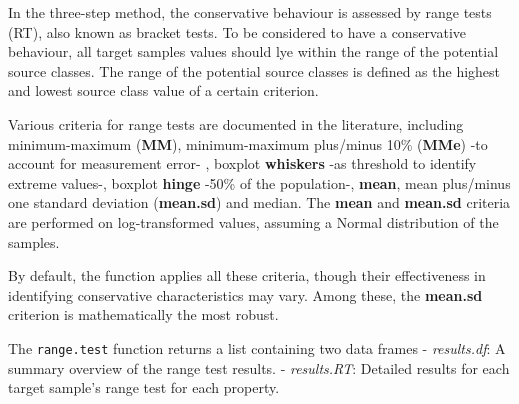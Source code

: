 \documentclass[
]{article}
\begin{document}
In the three-step method, the conservative behaviour is assessed by
range tests (RT), also known as bracket tests. To be considered to have
a conservative behaviour, all target samples values should lye within
the range of the potential source classes. The range of the potential
source classes is defined as the highest and lowest source class value
of a certain criterion.

Various criteria for range tests are documented in the literature,
including minimum-maximum (\textbf{MM}), minimum-maximum plus/minus 10\%
(\textbf{MMe}) -to account for measurement error- , boxplot
\textbf{whiskers} -as threshold to identify extreme values-, boxplot
\textbf{hinge} -50\% of the population-, \textbf{mean}, mean plus/minus
one standard deviation (\textbf{mean.sd}) and median. The \textbf{mean}
and \textbf{mean.sd} criteria are performed on log-transformed values,
assuming a Normal distribution of the samples.

By default, the function applies all these criteria, though their
effectiveness in identifying conservative characteristics may vary.
Among these, the \textbf{mean.sd} criterion is mathematically the most
robust.

The \texttt{range.test} function returns a list containing two data
frames - \emph{results.df}: A summary overview of the range test
results. - \emph{results.RT}: Detailed results for each target sample's
range test for each property.
\end{document}
